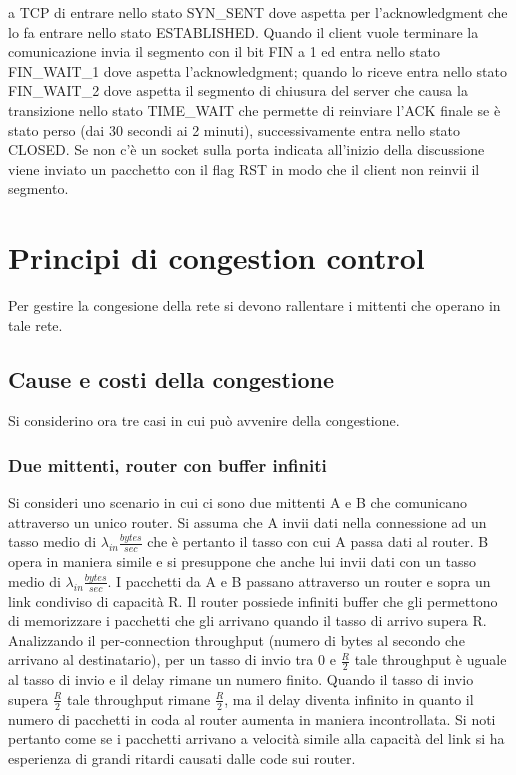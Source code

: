 a TCP di entrare nello stato SYN\_SENT dove aspetta per l'acknowledgment che lo fa entrare nello stato ESTABLISHED. Quando il client vuole terminare la 
comunicazione invia il segmento con il bit FIN a 1 ed entra nello stato FIN\_WAIT\_1 dove aspetta l'acknowledgment; quando lo riceve entra nello stato 
FIN\_WAIT\_2 dove aspetta il segmento di chiusura del server che causa la transizione nello stato TIME\_WAIT che permette di reinviare l'ACK finale se \`e 
stato perso (dai 30 secondi ai 2 minuti), successivamente entra nello stato CLOSED. Se non c'\`e un socket sulla porta indicata all'inizio della discussione
viene inviato un pacchetto con il flag RST in modo che il client non reinvii il segmento. 
\section{Principi di congestion control}
Per gestire la congesione della rete si devono rallentare i mittenti che operano in tale rete. 
\subsection{Cause e costi della congestione}
Si considerino ora tre casi in cui pu\`o avvenire della congestione. 
\subsubsection{Due mittenti, router con buffer infiniti}
Si consideri uno scenario in cui ci sono due mittenti A e B che comunicano attraverso un unico router. Si assuma che A invii dati nella connessione ad un 
tasso medio di $\lambda_{in}\frac{bytes}{sec}$ che \`e pertanto il tasso con cui A passa dati al router. B opera in maniera simile e si presuppone che anche
lui invii dati con un tasso medio di $\lambda_{in}\frac{bytes}{sec}$. I pacchetti da A e B passano attraverso un router e sopra un link condiviso di 
capacit\`a R. Il router possiede infiniti buffer che gli permettono di memorizzare i pacchetti che gli arrivano quando il tasso di arrivo supera R. 
Analizzando il per-connection throughput (numero di bytes al secondo che arrivano al destinatario), per un tasso di invio tra 0 e $\frac{R}{2}$ tale 
throughput \`e uguale al tasso di invio e il delay rimane un numero finito.  Quando il tasso di invio supera $\frac{R}{2}$ tale throughput rimane $\frac{R}
{2}$, ma il delay diventa infinito in quanto il numero di pacchetti in coda al router aumenta in maniera incontrollata. Si noti pertanto come se i pacchetti 
arrivano a velocit\`a simile alla capacit\`a del link si ha esperienza di grandi ritardi causati dalle code sui router. 
